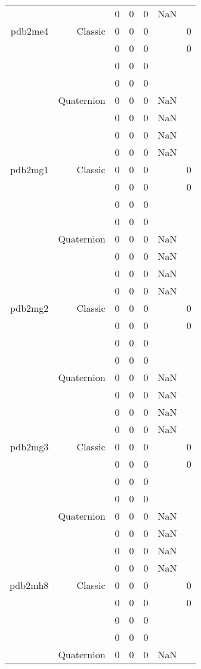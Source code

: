 \begin{xltabular}{\textwidth}{r|rcccSc}
& & 0 & 0 & 0 & NaN & \\ \addlinespace
pdb2me4 & Classic & 0 & 0 & 0 & & 0 \\
& & 0 & 0 & 0 & & 0 \\
& & 0 & 0 & 0 & & \\
& & 0 & 0 & 0 & & \\
& Quaternion & 0 & 0 & 0 & NaN & \\
& & 0 & 0 & 0 & NaN & \\
& & 0 & 0 & 0 & NaN & \\
& & 0 & 0 & 0 & NaN & \\ \addlinespace
pdb2mg1 & Classic & 0 & 0 & 0 & & 0 \\
& & 0 & 0 & 0 & & 0 \\
& & 0 & 0 & 0 & & \\
& & 0 & 0 & 0 & & \\
& Quaternion & 0 & 0 & 0 & NaN & \\
& & 0 & 0 & 0 & NaN & \\
& & 0 & 0 & 0 & NaN & \\
& & 0 & 0 & 0 & NaN & \\ \addlinespace
pdb2mg2 & Classic & 0 & 0 & 0 & & 0 \\
& & 0 & 0 & 0 & & 0 \\
& & 0 & 0 & 0 & & \\
& & 0 & 0 & 0 & & \\
& Quaternion & 0 & 0 & 0 & NaN & \\
& & 0 & 0 & 0 & NaN & \\
& & 0 & 0 & 0 & NaN & \\
& & 0 & 0 & 0 & NaN & \\ \addlinespace
pdb2mg3 & Classic & 0 & 0 & 0 & & 0 \\
& & 0 & 0 & 0 & & 0 \\
& & 0 & 0 & 0 & & \\
& & 0 & 0 & 0 & & \\
& Quaternion & 0 & 0 & 0 & NaN & \\
& & 0 & 0 & 0 & NaN & \\
& & 0 & 0 & 0 & NaN & \\
& & 0 & 0 & 0 & NaN & \\ \addlinespace
pdb2mh8 & Classic & 0 & 0 & 0 & & 0 \\
& & 0 & 0 & 0 & & 0 \\
& & 0 & 0 & 0 & & \\
& & 0 & 0 & 0 & & \\
& Quaternion & 0 & 0 & 0 & NaN & \\

\end{xltabular}
